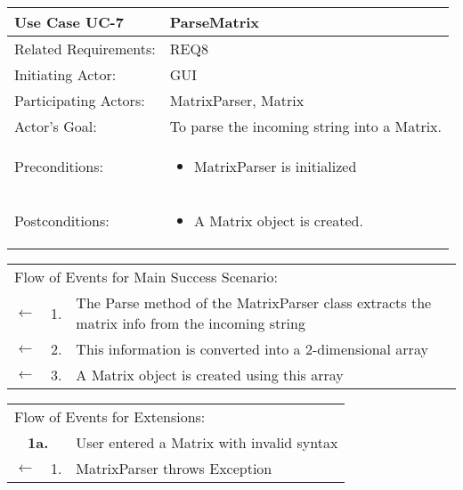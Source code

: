 \documentclass[11pt]{article}
\begin{document}
\newpage
\begin{center}
\begin{tabular}{p{1.5in}p{5in}}
\hline
\textbf{Use Case UC-7}     & \textbf{ParseMatrix} \\ \hline
Related Requirements: & REQ8 \\
Initiating Actor:     & GUI \\
Participating Actors: &MatrixParser, Matrix \\
Actor's Goal:          & To parse the incoming string into a Matrix. \\
Preconditions:         & \begin{itemize}[nosep]
		      \item  MatrixParser is initialized
                         \end{itemize} \\
Postconditions:        & \begin{itemize}[nosep]
                         \item A Matrix object is created.
                         \end{itemize} \\ \hline
\end{tabular}

\begin{tabular}{p{.25in}p{.25in}p{5.8in}}
\multicolumn{3}{l}{Flow of Events for Main Success Scenario:} \\
$\leftarrow$  & 1. & The Parse method of the MatrixParser class extracts the matrix info from the incoming string\\
$\leftarrow$  & 2. & This information is converted into a 2-dimensional array\\
$\leftarrow$ & 3.& A Matrix object is created using this array\\
\end{tabular}

\begin{tabular}{p{.25in}p{.25in}p{5.8in}}
\multicolumn{3}{l}{Flow of Events for Extensions:} \\
\multicolumn{2}{c}{\textbf{1a.}} & User entered a Matrix with invalid syntax \\
$\leftarrow$  & 1.           & MatrixParser throws Exception\\


\end{tabular}
\end{center}



\newpage
\end{document}

